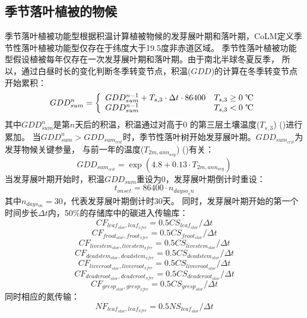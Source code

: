 \subsection{季节落叶植被的物候}\label{季节落叶植被的物候}
季节落叶植被功能型根据积温计算植被物候的发芽展叶期和落叶期，CoLM定义季节性落叶植被功能型仅存在于纬度大于19.5度非赤道区域。
季节性落叶植被功能型假设植被每年仅存在一次发芽展叶期和落叶期。由于南北半球冬夏反季，
所以，通过白昼时长的变化判断冬季转变节点，积温($GDD$)的计算在冬季转变节点开始累积\citep{white1997continental}：
\begin{equation}
GDD _{sum}^{n}=\left\{\begin{array}{ll}GDD _{sum}^{n-1}+T_{s, 3} \cdot \Delta t \cdot 86400 & T_{s, 3} \geq \text{0 \textcelsius} \\ GDD _{sum}^{n-1} & T_{s, 3}< \text{0 \textcelsius}\end{array}\right.
\end{equation}
其中$GDD_{sum}^n$是第$n$天后的积温，积温通过对高于0 \textcelsius 的第三层土壤温度($T_{s,3}$) (\textcelsius)进行累加。
当$GDD_{sum}^n>{GDD}_{sum_{crit}}$时，季节性落叶树开始发芽展叶期。${GDD}_{sum_{crit}}$为发芽物候关键参量，
与前一年的温度($T_{2m,ann_{avg}}$) (\textcelsius)有关：
\begin{equation}
GDD _{sum_{crit}}=\exp \left(4.8+0.13 \cdot T_{2 m, ann_{avg}}\right)
\end{equation}
当发芽展叶期开始时，积温${GDD}_{sum}$重设为0，发芽展叶期倒计时重设：
\begin{equation}
t_{o n s e t}=86400 \cdot n_{ {dayso }_{o} n}
\end{equation}
其中$n_{days_{on}}=30$，代表发芽展叶期倒计时30天。
同时，发芽展叶期开始的第一个时间步长$\Delta t$内，50\%的存储库中的碳进入传输库：
\begin{equation}
  CF_{leaf_{stor},leaf_{xfer}}=0.5 CS_{leaf_{stor}}/\Delta t
\end{equation}
\begin{equation}
  CF_{froot_{stor},froot_{xfer}}=0.5  CS_{froot_{stor}}/\Delta t
\end{equation}
\begin{equation}
  CF_{livestem_{stor},livestem_{xfer}}=0.5  CS_{livestem_{stor}}/\Delta t
\end{equation}
\begin{equation}
  CF_{deadstem_{stor},deadstem_{xfer}}=0.5  CS_{deadstem_{stor}}/\Delta t
\end{equation}
\begin{equation}
  CF_{livecroot_{stor},livecroot_{xfer}}=0.5  CS_{livecroot_{stor}}/\Delta t
\end{equation}
\begin{equation}
  CF_{deadcroot_{stor},deadcroot_{xfer}}=0.5 CS_{deadcroot_{stor}}/\Delta t
\end{equation}
\begin{equation}
  CF_{gresp_{stor},gresp_{xfer}}=0.5  CS_{gresp_{stor}}/\Delta t
\end{equation}
同时相应的氮传输：
\begin{equation}
NF_{leaf_{stor},leaf_{xfer}}=0.5  NS_{leaf_{stor}}/\Delta t
\end{equation}

